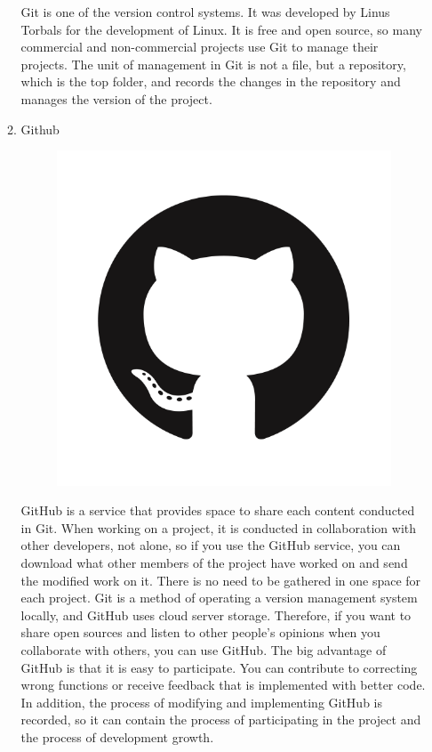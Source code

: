 \documentclass[conference]{IEEEtran}
\begin{document}
\begin{enumerate}
\begin{enumerate}
\begin{figure}[H]
                 \end{figure}
        Git is one of the version control systems. It was developed by Linus Torbals for the development of Linux. It is free and open source, so many commercial and non-commercial projects use Git to manage their projects. The unit of management in Git is not a file, but a repository, which is the top folder, and records the changes in the repository and manages the version of the project. \hfill \break
        \item Github
        \begin{figure}[H]
                 \centering
                 \includegraphics[scale=0.13]{new_assets/github-logo.png}
                 \end{figure}
       GitHub is a service that provides space to share each content conducted in Git. When working on a project, it is conducted in collaboration with other developers, not alone, so if you use the GitHub service, you can download what other members of the project have worked on and send the modified work on it. There is no need to be gathered in one space for each project. Git is a method of operating a version management system locally, and GitHub uses cloud server storage. Therefore, if you want to share open sources and listen to other people's opinions when you collaborate with others, you can use GitHub. The big advantage of GitHub is that it is easy to participate. You can contribute to correcting wrong functions or receive feedback that is implemented with better code. In addition, the process of modifying and implementing GitHub is recorded, so it can contain the process of participating in the project and the process of development growth.\\

\end{enumerate}
\end{enumerate}
\end{document}
